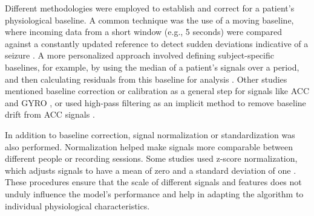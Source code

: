 Different methodologies were employed to establish and correct for a patient's physiological baseline. A common technique was the use of a moving baseline, where incoming data from a short window (e.g., 5 seconds) were compared against a constantly updated reference to detect sudden deviations indicative of a seizure \cite{Cogan2017-lg}. A more personalized approach involved defining subject-specific baselines, for example, by using the median of a patient's signals over a period, and then calculating residuals from this baseline for analysis \cite{Jiang2022-zu}. Other studies mentioned baseline correction or calibration as a general step for signals like ACC and GYRO \cite{Ge2023-ab, Wang2025-ql}, or used high-pass filtering as an implicit method to remove baseline drift from ACC signals \cite{Milosevic2016-ee}.

In addition to baseline correction, signal normalization or standardization was also performed. Normalization helped make signals more comparable between different people or recording sessions. Some studies used z-score normalization, which adjusts signals to have a mean of zero and a standard deviation of one \cite{Nasseri2021-xn, Hegarty-Craver2021-hk}. These procedures ensure that the scale of different signals and features does not unduly influence the model's performance and help in adapting the algorithm to individual physiological characteristics.
